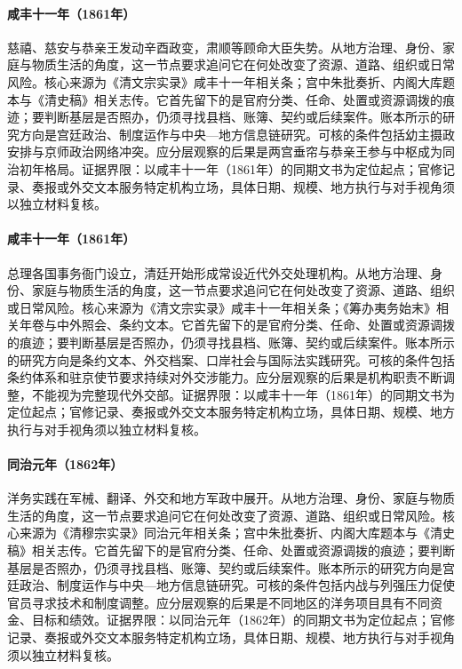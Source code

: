 \hypertarget{social:EQ-1861-XINYOU-COUP}{}\paragraph{咸丰十一年（1861年）}慈禧、慈安与恭亲王发动辛酉政变，肃顺等顾命大臣失势。从地方治理、身份、家庭与物质生活的角度，这一节点要求追问它在何处改变了资源、道路、组织或日常风险。核心来源为《清文宗实录》咸丰十一年相关条；宫中朱批奏折、内阁大库题本与《清史稿》相关志传。它首先留下的是官府分类、任命、处置或资源调拨的痕迹；要判断基层是否照办，仍须寻找县档、账簿、契约或后续案件。账本所示的研究方向是宫廷政治、制度运作与中央—地方信息链研究。可核的条件包括幼主摄政安排与京师政治网络冲突。应分层观察的后果是两宫垂帘与恭亲王参与中枢成为同治初年格局。证据界限：以咸丰十一年（1861年）的同期文书为定位起点；官修记录、奏报或外交文本服务特定机构立场，具体日期、规模、地方执行与对手视角须以独立材料复核。
\hypertarget{social:EQ-1861-ZONGLI-YAMEN}{}\paragraph{咸丰十一年（1861年）}总理各国事务衙门设立，清廷开始形成常设近代外交处理机构。从地方治理、身份、家庭与物质生活的角度，这一节点要求追问它在何处改变了资源、道路、组织或日常风险。核心来源为《清文宗实录》咸丰十一年相关条；《筹办夷务始末》相关年卷与中外照会、条约文本。它首先留下的是官府分类、任命、处置或资源调拨的痕迹；要判断基层是否照办，仍须寻找县档、账簿、契约或后续案件。账本所示的研究方向是条约文本、外交档案、口岸社会与国际法实践研究。可核的条件包括条约体系和驻京使节要求持续对外交涉能力。应分层观察的后果是机构职责不断调整，不能视为完整现代外交部。证据界限：以咸丰十一年（1861年）的同期文书为定位起点；官修记录、奏报或外交文本服务特定机构立场，具体日期、规模、地方执行与对手视角须以独立材料复核。
\hypertarget{social:EQ-1862-SELF-STRENGTHENING-ORIGINS}{}\paragraph{同治元年（1862年）}洋务实践在军械、翻译、外交和地方军政中展开。从地方治理、身份、家庭与物质生活的角度，这一节点要求追问它在何处改变了资源、道路、组织或日常风险。核心来源为《清穆宗实录》同治元年相关条；宫中朱批奏折、内阁大库题本与《清史稿》相关志传。它首先留下的是官府分类、任命、处置或资源调拨的痕迹；要判断基层是否照办，仍须寻找县档、账簿、契约或后续案件。账本所示的研究方向是宫廷政治、制度运作与中央—地方信息链研究。可核的条件包括内战与列强压力促使官员寻求技术和制度调整。应分层观察的后果是不同地区的洋务项目具有不同资金、目标和绩效。证据界限：以同治元年（1862年）的同期文书为定位起点；官修记录、奏报或外交文本服务特定机构立场，具体日期、规模、地方执行与对手视角须以独立材料复核。
